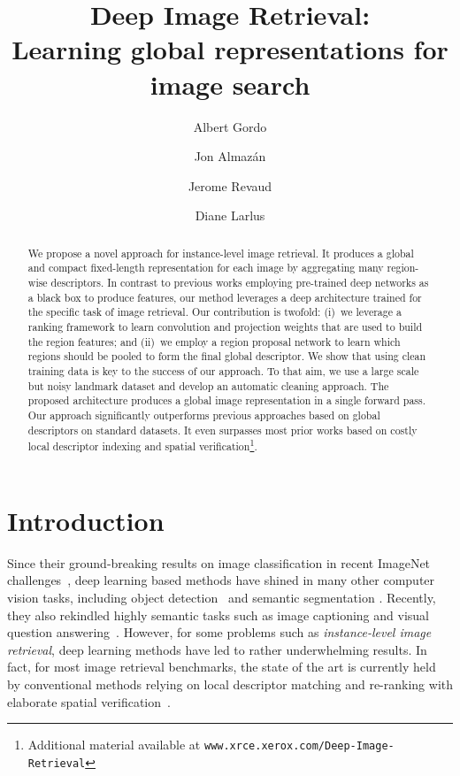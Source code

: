 \documentclass[runningheads]{llncs}
\begin{document}
\pagestyle{headings}
\mainmatter

\title{Deep Image Retrieval:\\Learning global representations for image search}



\author{Albert Gordo \and Jon Almaz\'an \and Jerome Revaud \and Diane Larlus}


\maketitle
\begin{abstract}
We propose a novel approach for instance-level image retrieval. It produces a global and compact fixed-length
representation for each image by aggregating many region-wise descriptors. In contrast to previous works employing
pre-trained deep networks as a black box to produce features, our method leverages a deep architecture trained
for the specific task of image retrieval. Our contribution is twofold: (i)~we 
leverage a ranking framework to learn convolution and projection weights that are used to build the region features;
and (ii)~we employ a region
proposal network to learn which regions should be pooled to form the  final global descriptor. We show that
using clean training data is key to the success of our approach. To that aim, we use a large scale but noisy
landmark dataset and develop an automatic cleaning approach.  The proposed architecture produces a
global image representation in a single forward pass. Our approach significantly outperforms previous approaches based
on global descriptors on standard datasets. It even surpasses most prior works based on costly local descriptor
indexing and spatial verification\footnote{Additional material available at \texttt{www.xrce.xerox.com/Deep-Image-Retrieval}}.
\end{abstract}

\section{Introduction}
Since their ground-breaking results on image classification in recent ImageNet
challenges~\cite{Krizhevsky2012,ILSVRC15}, deep learning based methods have shined in many other
computer vision tasks, including object detection~\cite{Girshick2014} and semantic segmentation \cite{Long2015}. 
Recently, they also rekindled highly semantic tasks such as image captioning \cite{frome13devise,karpathy14deep} and visual question answering~\cite{Antol2015VQA}.
However, for some problems such as \emph{instance-level image retrieval}, deep learning methods have led to rather
underwhelming results. In fact, for most image retrieval benchmarks, the state of the art is currently held 
by conventional methods relying on local descriptor matching and re-ranking with elaborate spatial verification~\cite{Mikulik2010,Tolias2015,Tolias2015b,Xinchao2015}.
\end{document}
